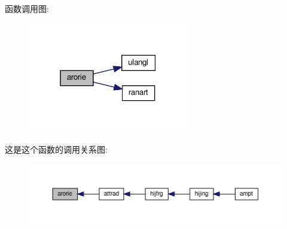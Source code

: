 函数调用图\+:
\nopagebreak
\begin{figure}[H]
\begin{center}
\leavevmode
\includegraphics[width=199pt]{arorie_8f90_a9bf3ea44d55ee6d65228f6605eccd9fb_cgraph}
\end{center}
\end{figure}
这是这个函数的调用关系图\+:
\nopagebreak
\begin{figure}[H]
\begin{center}
\leavevmode
\includegraphics[width=350pt]{arorie_8f90_a9bf3ea44d55ee6d65228f6605eccd9fb_icgraph}
\end{center}
\end{figure}
